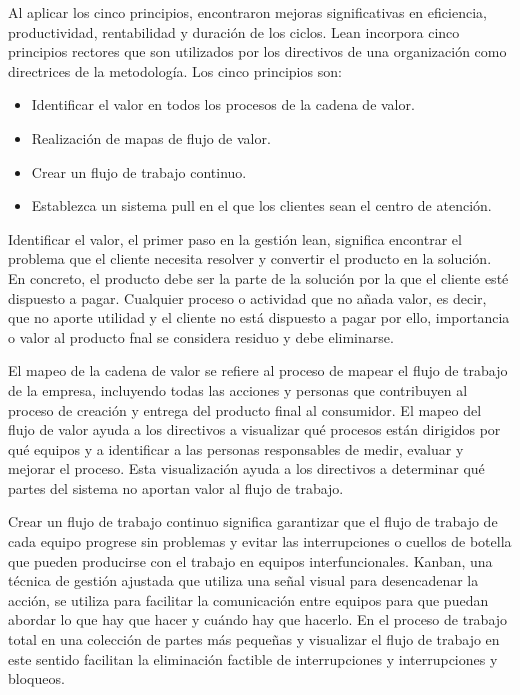 Al aplicar los cinco principios, encontraron mejoras significativas en eficiencia, productividad, rentabilidad y duración de los ciclos.
Lean incorpora cinco principios rectores que son utilizados por los directivos de una organización como directrices de la metodología. Los cinco principios son:

\begin{itemize}
    \item Identificar el valor en todos los procesos de la cadena de valor.
    \item Realización de mapas de flujo de valor.
    \item Crear un flujo de trabajo continuo.
    \item Establezca un sistema pull en el que los clientes sean el centro de atención.
\end{itemize}

Identificar el valor, el primer paso en la gestión lean, significa encontrar el problema que el cliente necesita resolver y convertir el producto en la solución.
En concreto, el producto debe ser la parte de la solución por la que el cliente esté dispuesto a pagar.
Cualquier proceso o actividad que no añada valor, es decir, que no aporte utilidad y el cliente no está dispuesto a pagar por ello, importancia o valor al producto fnal se considera residuo y debe eliminarse.

El mapeo de la cadena de valor se refiere al proceso de mapear el flujo de trabajo de la empresa, incluyendo todas las acciones y personas que contribuyen al proceso de creación y entrega del producto final al consumidor.
El mapeo del flujo de valor ayuda a los directivos a visualizar qué procesos están dirigidos por qué equipos y a identificar a las personas responsables de medir, evaluar y mejorar el proceso.
Esta visualización ayuda a los directivos a determinar qué partes del sistema no aportan valor al flujo de trabajo.

Crear un flujo de trabajo continuo significa garantizar que el flujo de trabajo de cada equipo progrese sin problemas y evitar las interrupciones o cuellos de botella que pueden producirse con el trabajo en equipos interfuncionales.
Kanban, una técnica de gestión ajustada que utiliza una señal visual para desencadenar la acción, se utiliza para facilitar la comunicación entre equipos para que puedan abordar lo que hay que hacer y cuándo hay que hacerlo.
En el proceso de trabajo total en una colección de partes más pequeñas y visualizar el flujo de trabajo en este sentido facilitan la eliminación factible de interrupciones y interrupciones y bloqueos.

